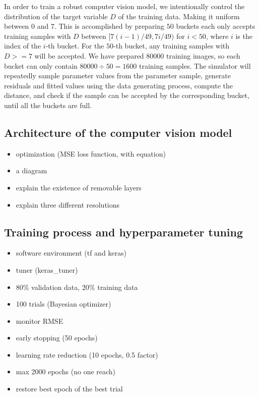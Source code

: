 \documentclass[]{interact}
\theoremstyle{plain}%
\theoremstyle{definition}
\theoremstyle{remark}
\providecommand{\tightlist}{%
  \setlength{\itemsep}{0pt}\setlength{\parskip}{0pt}}
\def\tightlist{}
\begin{document}
In order to train a robust computer vision model, we intentionally
control the distribution of the target variable \(D\) of the training
data. Making it uniform between \(0\) and \(7\). This is accomplished by
preparing \(50\) buckets each only accepts training samples with \(D\)
between \([7(i - 1)/49, 7i/49)\) for \(i < 50\), where \(i\) is the
index of the \(i\)-th bucket. For the \(50\)-th bucket, any training
samples with \(D >= 7\) will be accepted. We have prepared 80000
training images, so each bucket can only contain
\(80000 \div 50 = 1600\) training samples. The simulator will repeatedly
sample parameter values from the parameter sample, generate residuals
and fitted values using the data generating process, compute the
distance, and check if the sample can be accepted by the corresponding
bucket, until all the buckets are full.

\hypertarget{architecture-of-the-computer-vision-model}{%
\subsection{Architecture of the computer vision
model}\label{architecture-of-the-computer-vision-model}}

\begin{itemize}
\tightlist
\item
  optimization (MSE loss function, with equation)
\item
  a diagram
\item
  explain the existence of removable layers
\item
  explain three different resolutions
\end{itemize}

\hypertarget{training-process-and-hyperparameter-tuning}{%
\subsection{Training process and hyperparameter
tuning}\label{training-process-and-hyperparameter-tuning}}

\begin{itemize}
\tightlist
\item
  software environment (tf and keras)
\item
  tuner (keras\_tuner)
\item
  80\% validation data, 20\% training data
\item
  100 trials (Bayesian optimizer)
\item
  monitor RMSE
\item
  early stopping (50 epochs)
\item
  learning rate reduction (10 epochs, 0.5 factor)
\item
  max 2000 epochs (no one reach)
\item
  restore best epoch of the best trial
\end{itemize}
\end{document}
